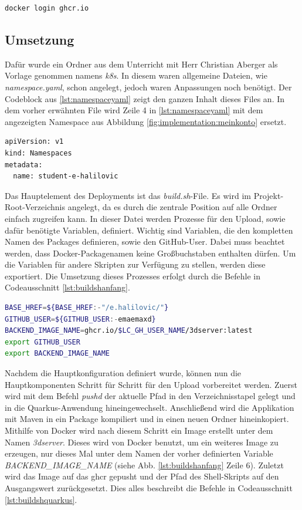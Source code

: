 \begin{lstlisting}[label=lst:loginghcr, language=bash, caption=GHCR Login]
docker login ghcr.io
\end{lstlisting}
\subsection{Umsetzung}

Dafür wurde ein Ordner aus dem Unterricht mit Herr Christian Aberger als Vorlage genommen namens \emph{k8s}. 
In diesem waren allgemeine Dateien, wie \emph{namespace.yaml}, schon angelegt, jedoch waren Anpassungen noch benötigt. 
Der Codeblock aus \ref{lst:namespaceyaml} zeigt den ganzen Inhalt dieses Files an. 
In dem vorher erwähnten File wird Zeile 4 in \ref{lst:namespaceyaml} mit dem angezeigten Namespace aus Abbildung \ref{fig:implementation:meinkonto} ersetzt. 
\begin{lstlisting}[label=lst:namespaceyaml, language=bash, caption=Namespace konfiguration in namespace.yaml]
apiVersion: v1
kind: Namespaces
metadata:
  name: student-e-halilovic
\end{lstlisting}

Das Hauptelement des Deployments ist das \emph{build.sh}-File. 
Es wird im Projekt-Root-Verzeichnis angelegt, da es durch die zentrale Position auf alle Ordner einfach zugreifen kann. 
In dieser Datei werden Prozesse für den Upload, sowie dafür benötigte Variablen, definiert. 
Wichtig sind Variablen, die den kompletten Namen des Packages definieren, sowie den GitHub-User. 
Dabei muss beachtet werden, dass Docker-Packagenamen keine Großbuchstaben enthalten dürfen. 
Um die Variablen für andere Skripten zur Verfügung zu stellen, werden diese exportiert. 
Die Umsetzung dieses Prozesses erfolgt durch die Befehle in Codeausschnitt \ref{lst:buildshanfang}.

\begin{lstlisting}[label=lst:buildshanfang, language=bash, caption=Anfang der build.sh-Datei]
BASE_HREF=${BASE_HREF:-"/e.halilovic/"}
GITHUB_USER=${GITHUB_USER:-emaemaxd}
BACKEND_IMAGE_NAME=ghcr.io/$LC_GH_USER_NAME/3dserver:latest
export GITHUB_USER
export BACKEND_IMAGE_NAME
\end{lstlisting}    

Nachdem die Hauptkonfiguration definiert wurde, können nun die Hauptkomponenten Schritt für Schritt für den Upload vorbereitet werden. 
Zuerst wird mit dem Befehl \emph{pushd} der aktuelle Pfad in den Verzeichnisstapel gelegt und in die Quarkus-Anwendung hineingewechselt. 
Anschließend wird die Applikation mit Maven in ein Package kompiliert und in einen neuen Ordner hineinkopiert. 
Mithilfe von Docker wird nach diesem Schritt ein Image erstellt unter dem Namen \emph{3dserver}. 
Dieses wird von Docker benutzt, um ein weiteres Image zu erzeugen, nur dieses Mal unter dem Namen der vorher definierten Variable \emph{BACKEND\_IMAGE\_NAME} (siehe Abb. \ref{lst:buildshanfang} Zeile 6). 
Zuletzt wird das Image auf das \gls{ghcr} gepusht und der Pfad des Shell-Skripts auf den Ausgangswert zurückgesetzt. 
Dies alles beschreibt die Befehle in Codeausschnitt \ref{lst:buildshquarkus}.

